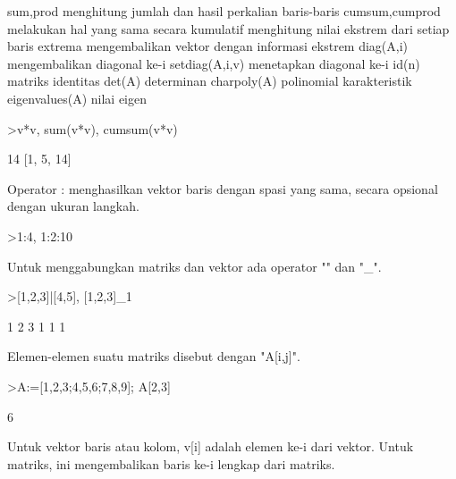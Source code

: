 \documentclass[a4paper,10pt]{article}
\begin{document}
\begin{eulernotebook}
\begin{eulercomment}
\begin{eulercomment}
\begin{eulercomment}
\begin{eulercomment}
\begin{eulercomment}
\begin{eulercomment}
\begin{eulercomment}
\end{eulercomment}
\begin{eulerttcomment}
  sum,prod menghitung jumlah dan hasil perkalian baris-baris
  cumsum,cumprod melakukan hal yang sama secara kumulatif
  menghitung nilai ekstrem dari setiap baris
  extrema mengembalikan vektor dengan informasi ekstrem
  diag(A,i) mengembalikan diagonal ke-i
  setdiag(A,i,v) menetapkan diagonal ke-i
  id(n) matriks identitas
  det(A) determinan
  charpoly(A) polinomial karakteristik
  eigenvalues(A) nilai eigen
\end{eulerttcomment}
\begin{eulerprompt}
>v*v, sum(v*v), cumsum(v*v)
\end{eulerprompt}
\begin{euleroutput}
  [1,  4,  9]
  14
  [1,  5,  14]
\end{euleroutput}
\begin{eulercomment}
Operator : menghasilkan vektor baris dengan spasi yang sama, secara
opsional dengan ukuran langkah.
\end{eulercomment}
\begin{eulerprompt}
>1:4, 1:2:10
\end{eulerprompt}
\begin{euleroutput}
  [1,  2,  3,  4]
  [1,  3,  5,  7,  9]
\end{euleroutput}
\begin{eulercomment}
Untuk menggabungkan matriks dan vektor ada operator "\textbar{}" dan "\_".
\end{eulercomment}
\begin{eulerprompt}
>[1,2,3]|[4,5], [1,2,3]_1
\end{eulerprompt}
\begin{euleroutput}
  [1,  2,  3,  4,  5]
              1             2             3 
              1             1             1 
\end{euleroutput}
\begin{eulercomment}
Elemen-elemen suatu matriks disebut dengan "A[i,j]".
\end{eulercomment}
\begin{eulerprompt}
>A:=[1,2,3;4,5,6;7,8,9]; A[2,3]
\end{eulerprompt}
\begin{euleroutput}
  6
\end{euleroutput}
\begin{eulercomment}
Untuk vektor baris atau kolom, v[i] adalah elemen ke-i dari vektor.
Untuk matriks, ini mengembalikan baris ke-i lengkap dari matriks.

\end{eulercomment}
\end{eulercomment}
\end{eulercomment}
\end{eulercomment}
\end{eulercomment}
\end{eulercomment}
\end{eulercomment}
\end{eulernotebook}
\end{document}
